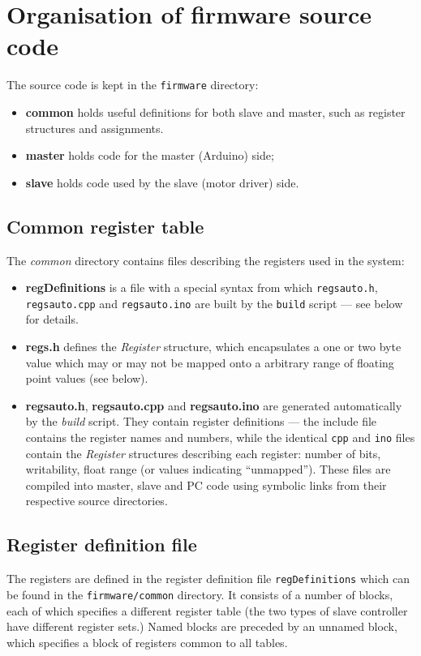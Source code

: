 \section{Organisation of firmware source code}

The source code is kept in the \texttt{firmware} directory:
\begin{itemize}
\item \textbf{common} holds useful definitions for both slave and master, such as register 
structures and assignments.
\item \textbf{master} holds code for the master (Arduino) side;
\item \textbf{slave} holds code used by the slave (motor driver) side.
\end{itemize}
\subsection{Common register table}
The \emph{common} directory contains files describing the registers used
in the system:
\begin{itemize}
\item \textbf{regDefinitions} is a file with a special syntax from which
\texttt{regsauto.h}, \texttt{regsauto.cpp} and \texttt{regsauto.ino} are
built by the \texttt{build} script --- see below for details.
\item \textbf{regs.h} defines the \emph{Register} structure, which
encapsulates a one or two byte value which may or may not be mapped onto
a arbitrary range of floating point values (see below).
\item \textbf{regsauto.h}, \textbf{regsauto.cpp} and \textbf{regsauto.ino}
are generated automatically by the \emph{build} script. They contain
register definitions --- the include file contains the register names and
numbers, while the identical \texttt{cpp} and \texttt{ino} files contain
the \emph{Register} structures describing each register: number of bits,
writability, float range (or values indicating ``unmapped'').
These files are compiled into master, slave and PC code using symbolic links
from their respective source directories.
\end{itemize}
\subsection{Register definition file}
The registers are defined in the register definition file
\texttt{regDefinitions} which can be found in the \texttt{firmware/common} 
directory. It consists of a number of blocks, each of which
specifies a different register table (the two types of slave
controller have different register sets.) Named blocks are
preceded by an unnamed block, which specifies a block
of registers common to all tables.

